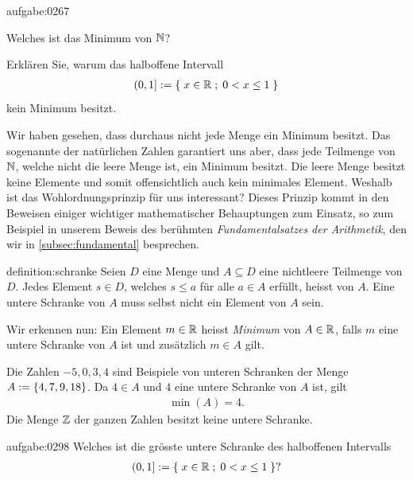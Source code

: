 \begin{aufgabe}{aufgabe:0267}
\begin{aenum}
    \item Welches ist das Minimum von $\mathbb{N}$?
    \item Erklären Sie, warum das halboffene Intervall 
    \begin{align*}
        \left(0, 1\right] := \left\{\;x\in\mathbb{R} \; ; \; 0<x\leq 1 \;\right\}
    \end{align*}
    kein Minimum besitzt.
\end{aenum}
\end{aufgabe}
\noindent
Wir haben gesehen, dass durchaus nicht jede Menge ein Minimum besitzt. Das sogenannte  der natürlichen Zahlen garantiert uns aber, dass jede Teilmenge von $\mathbb{N}$, welche nicht die leere Menge ist, ein Minimum besitzt. Die leere Menge besitzt keine Elemente und somit offensichtlich auch kein minimales Element. Weshalb ist das Wohlordnungsprinzip für uns interessant? Dieses Prinzip kommt in den Beweisen einiger wichtiger mathematischer Behauptungen zum Einsatz, so zum Beispiel in unserem Beweis des berühmten \textit{Fundamentalsatzes der Arithmetik}, den wir in \cref{subsec:fundamental} besprechen.

\begin{definition}{definition:schranke}
Seien $D$ eine Menge und $A\subseteq D$ eine nichtleere Teilmenge von $D$. Jedes Element $s\in D$, welches $s \leq a$ für alle $a\in A$ erfüllt, heisst  von $A$. Eine untere Schranke von $A$ muss selbst nicht ein Element von $A$ sein.   
\end{definition}
\noindent
Wir erkennen nun: Ein Element $m\in\mathbb{R}$ heisst \textit{Minimum} von $A\in\mathbb{R}$, falls $m$ eine untere Schranke von $A$ ist und zusätzlich $m\in A$ gilt.

\beispiele{-}{}
{Die Zahlen $-5, 0, 3, 4$ sind Beispiele von unteren Schranken der Menge $A:=\left\{4,7,9,18\right\}$. Da $4\in A$ und $4$ eine untere Schranke von $A$ ist, gilt
\begin{align*}
    \min(A) = 4.
\end{align*}
}
{Die Menge $\mathbb{Z}$ der ganzen Zahlen besitzt keine untere Schranke.}

\begin{aufgabe}{aufgabe:0298}
Welches ist die grösste untere Schranke des halboffenen Intervalls
    \begin{align*}
        \left(0, 1\right] := \left\{\;x\in\mathbb{R} \; ; \; 0<x\leq 1 \;\right\}?
    \end{align*}
\end{aufgabe}

